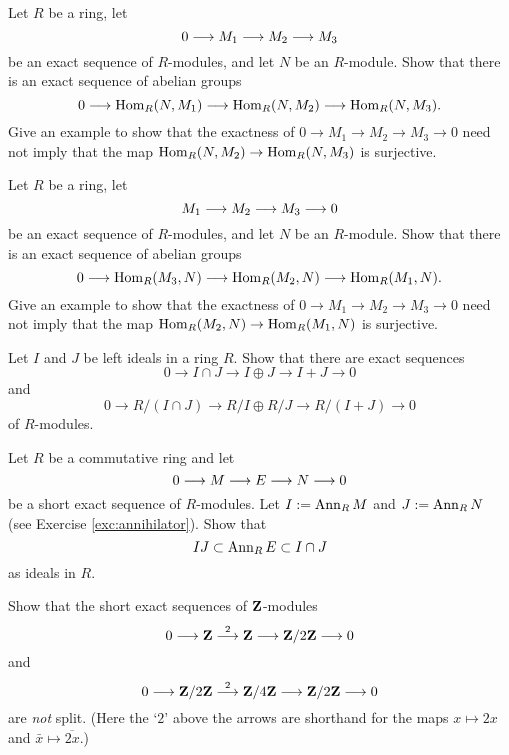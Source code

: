 \begin{exercise} \label{exc:covariant-short-exact-hom}
Let $R$ be a ring,  let
\begin{equation}\label{eq:exc-short-exact-hom}
	0 \longrightarrow M_1 \longrightarrow M_2 \longrightarrow M_3 
\end{equation}
be an exact sequence of $R$-modules, and let $N$ be an $R$-module. Show that there 
is an exact sequence of abelian groups
\[
	0 \longrightarrow \operatorname{Hom}_R(N,M_1) \longrightarrow \operatorname{Hom}_R(N,M_2) \longrightarrow \operatorname{Hom}_R(N,M_3).
\]
Give an example to show that the exactness of $0\to M_1 \to M_2\to M_3\to 0$ need not imply
that the map $\operatorname{Hom}_R(N,M_2)\to \operatorname{Hom}_R(N,M_3)$ is surjective.
\end{exercise}

\begin{exercise}\label{exc:contravariant-short-exact-hom}
Let $R$ be a ring,  let
\[
	 M_1 \longrightarrow M_2 \longrightarrow M_3 \longrightarrow 0
\]
be an exact sequence of $R$-modules, and let $N$ be an $R$-module. Show that there 
is an exact sequence of abelian groups
\[
	0 \longrightarrow \operatorname{Hom}_R(M_3,N) \longrightarrow \operatorname{Hom}_R(M_2,N) \longrightarrow \operatorname{Hom}_R(M_1,N).
\]
Give an example to show that the exactness of $0\to M_1 \to M_2\to M_3\to 0$ need not imply
that the map $\operatorname{Hom}_R(M_2,N)\to \operatorname{Hom}_R(M_1,N)$ is surjective.
\end{exercise}


\begin{exercise}
Let $I$ and $J$ be left ideals in a ring $R$. Show that there are exact sequences
\[
	0 \to I \cap J \to I \oplus J \to I + J \to 0
\]
and
\[
	0 \to R/(I\cap J) \to R/I \oplus R/J \to R/(I+J) \to 0
\]
of $R$-modules. 
\end{exercise}



\begin{exercise}
Let $R$ be a commutative ring and let
\[
	0 \longrightarrow M \longrightarrow E \longrightarrow N \longrightarrow 0
\]
be a short exact sequence of $R$-modules. Let $I:=\operatorname{Ann}_R M$ and $J := \operatorname{Ann}_R N$ (see Exercise \ref{exc:annihilator}). Show that
\[
	IJ \subset \operatorname{Ann}_R E \subset I \cap J
\]
as ideals in $R$.
\end{exercise}



\begin{exercise}\label{exc:nonsplit-examples}
Show that the short exact sequences of ${\mathbf{Z}}$-modules
\[
	0 \longrightarrow {\mathbf{Z}} \overset{2}{\longrightarrow} {\mathbf{Z}} \longrightarrow {\mathbf{Z}}/2{\mathbf{Z}} \longrightarrow 0
\]
and
\[
	0 \longrightarrow {\mathbf{Z}}/2{\mathbf{Z}} \overset{2}{\longrightarrow} {\mathbf{Z}}/4{\mathbf{Z}} \longrightarrow {\mathbf{Z}}/2{\mathbf{Z}} \longrightarrow 0
\]
are \emph{not} split. (Here the `$2$' above the arrows are shorthand for the maps $x\mapsto 2x$ and $\bar{x}\mapsto \overline{2x}$.)
\end{exercise}


